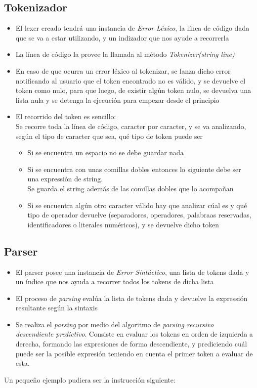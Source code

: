 \documentclass[12pt]{article}
\begin{document}
\subsection*{Tokenizador}
\begin{itemize}
	\item El lexer creado tendrá una instancia de \emph{Error Léxico}, la línea de código dada que se va a estar utilizando, y un indizador que nos ayude a recorrerla
	\item La línea de código la provee la llamada al método \emph{Tokenizer(string line)}
	\item En caso de que ocurra un error léxico al tokenizar, se lanza dicho error notificando al usuario que el token encontrado no es válido, y se devuelve el token como nulo, para que luego, de existir algún token nulo, se devuelva una lista nula y se detenga la ejecución para empezar desde el principio
	\item El recorrido del token es sencillo: \\
	Se recorre toda la línea de código, caracter por caracter, y se va analizando, según el tipo de caracter que sea, qué tipo de token puede ser
	\begin{itemize}
		\item Si se encuentra un espacio no se debe guardar nada
		\item Si se encuentra con unas comillas dobles entonces lo siguiente debe ser una expressión de string. \\
		Se guarda el string además de las comillas dobles que lo acompañan
		\item Si se encuentra algún otro caracter válido hay que analizar cúal es y qué tipo de operador devuelve (separadores, operadores, palabraas reservadas, identificadores o literales numéricos), y se devuelve dicho token
	\end{itemize}
\end{itemize}

\subsection*{Parser}
\begin{itemize}
	\item El parser posee una instancia de \emph{Error Sintáctico}, una lista de tokens dada y un índice que nos ayuda a recorrer todos los tokens de dicha lista
	\item El proceso de \textit{parsing} evalúa la lista de tokens dada y devuelve la expressión resultante según la sintaxis
	\item Se realiza el \textit{parsing} por medio del algoritmo de \textit{parsing recursivo descendiente predictivo}.
	Consiste en evaluar los tokens en orden de izquierda a derecha, formando las expresiones de forma descendiente, y prediciendo cuál puede ser la posible expresión teniendo en cuenta el primer token a evaluar de esta.	
\end{itemize}
	Un pequeño ejemplo pudiera ser la instrucción siguiente:
	
\end{document}

